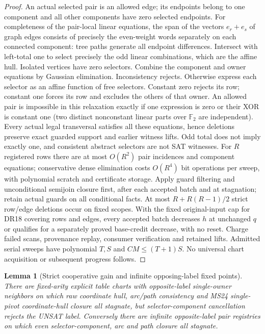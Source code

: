 \documentclass[11pt]{article}
\newtheorem{lemma}[theorem]{Lemma}
\begin{document}
\begin{proof}
An actual selected pair is an allowed edge; its endpoints belong to one component and all other components have zero selected endpoints. For completeness of the pair-local linear equations, the span of the vectors $e_r+e_s$ of graph edges consists of precisely the even-weight words separately on each connected component: tree paths generate all endpoint differences. Intersect with left-total one to select precisely the odd linear combinations, which are the affine hull. Isolated vertices have zero selectors. Combine the component and owner equations by Gaussian elimination. Inconsistency rejects. Otherwise express each selector as an affine function of free selectors. Constant zero rejects its row; constant one forces its row and excludes the others of that owner. An allowed pair is impossible in this relaxation exactly if one expression is zero or their XOR is constant one (two distinct nonconstant linear parts over $\mathbb F_2$ are independent). Every actual legal transversal satisfies all these equations, hence deletions preserve exact guarded support and earlier witness lifts. Odd total does not imply exactly one, and consistent abstract selectors are not SAT witnesses.
For $R$ registered rows there are at most $O(R^2)$ pair incidences and component equations; conservative dense elimination costs $O(R^4)$ bit operations per sweep, with polynomial scratch and certificate storage. Apply guard filtering and unconditional semijoin closure first, after each accepted batch and at stagnation; retain actual guards on all conditional facts. At most $R+R(R-1)/2$ strict row/edge deletions occur on fixed scopes. With the fixed original-input cap for DR18 covering rows and edges, every accepted batch decreases $h$ at unchanged $q$ or qualifies for a separately proved base-credit decrease, with no reset. Charge failed scans, provenance replay, consumer verification and retained lifts. Admitted serial sweeps have polynomial $T,S$ and $CM\le(T+1)S$. No universal chart acquisition or subsequent progress follows.
\end{proof}
\begin{lemma}[Strict cooperative gain and infinite opposing-label fixed points]\label{lem:rt24-family}
There are fixed-arity explicit table charts with opposite-label single-owner neighbors on which raw coordinate hull, arc/path consistency and MS24 single-pivot coordinate-hull closure all stagnate, but selector-component cancellation rejects the UNSAT label. Conversely there are infinite opposite-label pair registries on which even selector-component, arc and path closure all stagnate.
\end{lemma}
\end{document}
